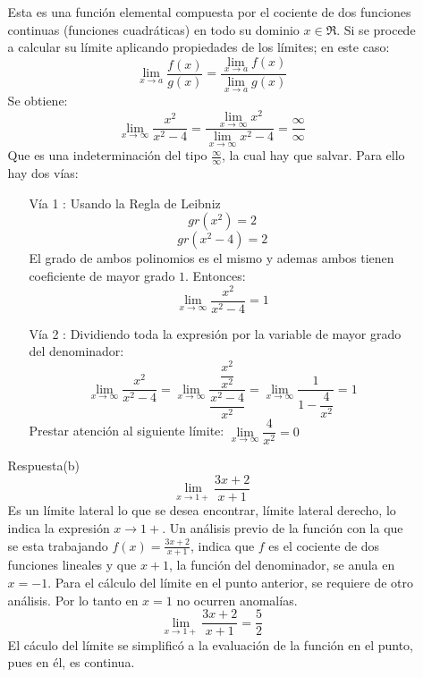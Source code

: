 \documentclass[10pt,twoside]{SelfArx} %
\begin{document}
\begin{enumerate}
\begin{enumerate}
	Esta es una función elemental compuesta por el cociente de dos funciones continuas (funciones cuadráticas) en todo su dominio $ x\in\Re $. Si se procede a calcular su límite aplicando propiedades de los límites; en este caso:
	\[ \lim\limits_{x\rightarrow a}\dfrac{f(x)}{g(x)}=\frac{\lim\limits_{x\rightarrow a}f(x)}{\lim\limits_{x\rightarrow a}g(x)} \]
	Se obtiene:
	\[ \lim\limits_{x\rightarrow\infty}\dfrac{x^{2}}{x^{2}-4}=\frac{\lim\limits_{x\rightarrow\infty}x^{2}}{\lim\limits_{x\rightarrow\infty}x^{2}-4}=\frac{\infty}{\infty} \]
	Que es una indeterminación del tipo $ \frac{\infty}{\infty}  $, la cual hay que salvar. Para ello hay dos vías:
	\begin{enumerate}
		\item[Vía 1]: Usando la Regla de Leibniz\\
		\[ gr(x^{2})=2 \]
		\[ gr(x^{2}-4)=2 \]
		El grado de ambos polinomios es el mismo y ademas ambos tienen coeficiente de mayor grado $ 1 $. Entonces:
		\[ \lim\limits_{x\rightarrow\infty}\dfrac{x^{2}}{x^{2}-4}=1 \]
		\item[Vía 2]: Dividiendo toda la expresión por la variable de mayor grado del denominador:
		\[ \lim\limits_{x\rightarrow\infty}\dfrac{x^{2}}{x^{2}-4}=\lim\limits_{x\rightarrow\infty}\dfrac{\dfrac{x^{2}}{x^{2}}}{\dfrac{x^{2}-4}{x^{2}}}=\lim\limits_{x\rightarrow\infty}\dfrac{1}{1-\dfrac{4}{x^{2}}}=1 \]
		Prestar atención al siguiente límite: $ \lim\limits_{x\rightarrow\infty}\dfrac{4}{x^{2}}=0 $
	\end{enumerate}
	\item[Respuesta(b)]
	\[ \lim\limits_{x\rightarrow1+}\frac{3x+2}{x+1} \]
	Es un límite lateral lo que se desea encontrar, límite lateral derecho, lo indica la expresión $ x\rightarrow1+ $. Un análisis previo de la función con la que se esta trabajando $ f(x)=\frac{3x+2}{x+1} $, indica que $ f $ es el cociente de dos funciones lineales y que $ x+1 $, la función del denominador, se anula en $ x=-1 $. Para el cálculo del límite en el punto anterior, se requiere de otro análisis. Por lo tanto en $ x=1 $ no ocurren anomalías.\\
	\[ \lim\limits_{x\rightarrow1+}\frac{3x+2}{x+1}=\dfrac{5}{2} \]
	El cáculo del límite se simplificó a la evaluación de la función en el punto, pues en él, es continua.
	

\end{enumerate}
\end{enumerate}
\end{document}
